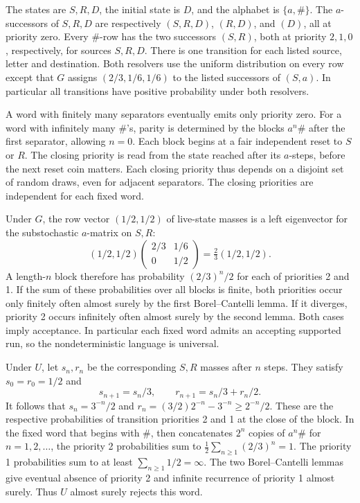 \documentclass[11pt]{amsart}
\begin{document}
The states are \(S,R,D\), the initial state is \(D\), and the alphabet is \(\{a,\#\}\). The \(a\)-successors of \(S,R,D\) are respectively \((S,R,D)\), \((R,D)\), and \((D)\), all at priority zero. Every \(\#\)-row has the two successors \((S,R)\), both at priority \(2,1,0\), respectively, for sources \(S,R,D\). There is one transition for each listed source, letter and destination. Both resolvers use the uniform distribution on every row except that \(G\) assigns \((2/3,1/6,1/6)\) to the listed successors of \((S,a)\). In particular all transitions have positive probability under both resolvers.

A word with finitely many separators eventually emits only priority zero. For a word with infinitely many \(\#\)'s, parity is determined by the blocks \(a^n\#\) after the first separator, allowing \(n=0\). Each block begins at a fair independent reset to \(S\) or \(R\). The closing priority is read from the state reached after its \(a\)-steps, before the next reset coin matters. Each closing priority thus depends on a disjoint set of random draws, even for adjacent separators. The closing priorities are independent for each fixed word.

Under \(G\), the row vector \((1/2,1/2)\) of live-state masses is a left eigenvector for the substochastic \(a\)-matrix on \(S,R\):
\[
  (1/2,1/2)
  \begin{pmatrix}2/3&1/6\\0&1/2\end{pmatrix}
  =\tfrac23(1/2,1/2).
\]
A length-\(n\) block therefore has probability \((2/3)^n/2\) for each of priorities 2 and 1. If the sum of these probabilities over all blocks is finite, both priorities occur only finitely often almost surely by the first Borel--Cantelli lemma. If it diverges, priority 2 occurs infinitely often almost surely by the second lemma. Both cases imply acceptance. In particular each fixed word admits an accepting supported run, so the nondeterministic language is universal.

Under \(U\), let \(s_n,r_n\) be the corresponding \(S,R\) masses after \(n\) steps. They satisfy \(s_0=r_0=1/2\) and
\[
 s_{n+1}=s_n/3,\qquad r_{n+1}=s_n/3+r_n/2.
\]
It follows that \(s_n=3^{-n}/2\) and \(r_n=(3/2)2^{-n}-3^{-n}\ge 2^{-n}/2\). These are the respective probabilities of transition priorities 2 and 1 at the close of the block. In the fixed word that begins with \(\#\), then concatenates \(2^n\) copies of \(a^n\#\) for \(n=1,2,\ldots\), the priority 2 probabilities sum to \(\frac12\sum_{n\ge1}(2/3)^n=1\). The priority 1 probabilities sum to at least \(\sum_{n\ge1}1/2=\infty\). The two Borel--Cantelli lemmas give eventual absence of priority 2 and infinite recurrence of priority 1 almost surely. Thus \(U\) almost surely rejects this word.
\end{document}
